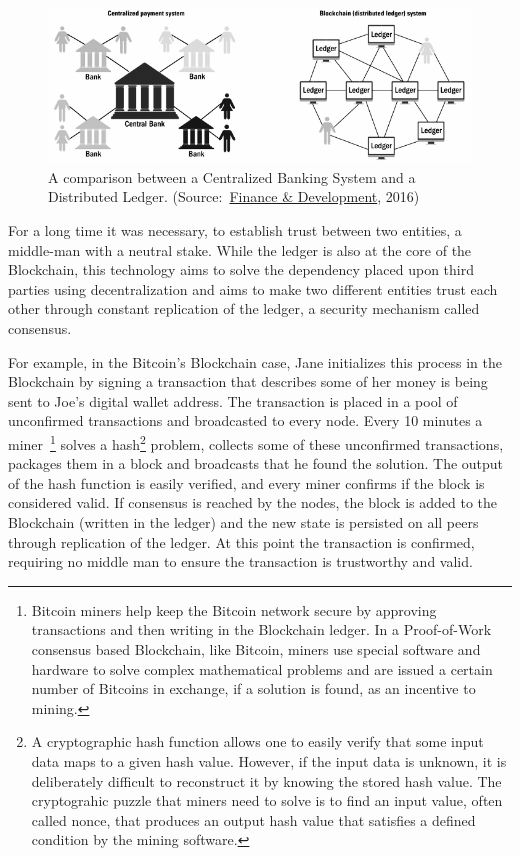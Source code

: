 \begin{figure}[h]
  \centering
  \includegraphics[width=1\linewidth]{imgs/blockchainvscentralizedNetwork.png}
  \caption{\label{fig:centralizedvsdescentralized} A comparison between a
  Centralized Banking System and a Distributed Ledger. (Source:~\href{https://www.imf.org/external/pubs/ft/fandd/}{Finance \& Development}, 2016)}
\end{figure}

For a long time it was necessary, to establish trust between two entities, a
middle-man with a neutral stake. While the ledger is also at the core of the
Blockchain, this technology aims to solve the dependency placed upon third
parties using decentralization and aims to make two different entities trust
each other through constant replication of the ledger, a security mechanism
called consensus.

For example, in the Bitcoin's Blockchain case, Jane initializes this process in the Blockchain by signing a transaction that describes some of her money is being sent to Joe's digital wallet address. The transaction is placed in a pool of unconfirmed transactions and broadcasted to every node. Every 10 minutes a miner~\footnote{Bitcoin miners help keep the Bitcoin network secure by approving transactions and then writing in the Blockchain ledger. In a Proof-of-Work consensus based Blockchain, like Bitcoin, miners use special software and hardware to solve complex mathematical problems and are issued a certain number of Bitcoins in exchange, if a solution is found, as an incentive to mining.} solves a hash\footnote{A cryptographic hash function allows one to easily verify that some input data maps to a given hash value. However, if the input data is unknown, it is deliberately difficult to reconstruct it by knowing the stored hash value. The cryptograhic puzzle that miners need to solve is to find an input value, often called nonce, that produces an output hash value that satisfies a defined condition by the mining software.} problem, collects some of these unconfirmed transactions, packages them in a block and broadcasts that he found the solution. The output of the hash function is easily verified, and every miner confirms if the block is considered valid. If consensus is reached by the nodes, the block is added to the Blockchain (written in the ledger) and the new state is persisted on all peers through replication of the ledger. At this point the transaction is confirmed, requiring no middle man to ensure the transaction is trustworthy and valid.

